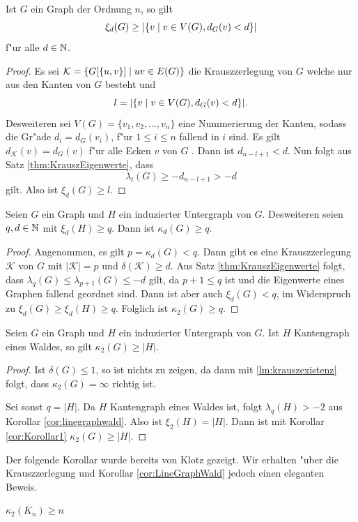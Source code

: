 \begin{corollary}
  Ist $G$ ein Graph der Ordnung $n$, so gilt $$\xi_{d}(G) \geq | \{v \;|\; v\in V(G), d_{G}(v) < d \}|$$
  f"ur alle $d\in {\mathbb{N}}$. 
  \label{cor:xiorderschranke}
\end{corollary}
\begin{proof}
  Es sei $\mathcal{K}= \{G[\{u,v\}] \;|\; uv\in E(G) \}$ die Krauszzerlegung von $G$ welche nur aus den Kanten von $G$ besteht und $$l = |\{v \;|\; v\in V(G), d_{G}(v) < d \}|.$$ 
  Desweiteren sei $V(G) = \{ v_1,v_2,\dots , v_n\}$ eine Nummerierung der Kanten, sodass die Gr"ade $d_i = d_{G}(v_i)$, f"ur $1\leq i \leq n$ fallend in $i$ sind. 
  Es gilt $d_{\mathcal{K}}(v) = d_{G}(v)$ f"ur alle Ecken $v$ von $G$ . Dann ist $d_{n-l+1} < d$. Nun folgt aus Satz \ref{thm:KrauszEigenwerte}, dass
    $$\lambda_{l}(G) \geq - d_{n-l+1} > -d$$
    gilt. Also ist $\xi_{d}(G) \geq l$. 
  \end{proof}

  \begin{corollary}
    \label{cor:Korollar1}
    Seien $G$ ein Graph und $H$ ein induzierter Untergraph von $G$. Desweiteren seien $q,d \in {\mathbb{N}}$ mit $\xi_{d}(H) \geq q$. Dann ist $\kappa_{d}(G) \geq q$.
  \end{corollary}

  \begin{proof}
    Angenommen, es gilt $p = \kappa_{d}(G) < q$. Dann gibt es  eine Krauszzerlegung $\mathcal{K}$ von $G$ mit $|\mathcal{K}| = p$ und $\delta(\mathcal{K}) \geq d$. 
    Aus Satz \ref{thm:KrauszEigenwerte} folgt, dass $\lambda_{q}(G) \leq \lambda_{p+1}(G) \leq -d $ gilt, da $p+1 \leq q$ ist und die Eigenwerte eines Graphen fallend geordnet sind. 
    Dann ist aber auch $\xi_{d}(G) < q$, im Widerspruch zu $\xi_{d}(G) \geq \xi_{d}(H) \geq  q$. Folglich ist $\kappa_2(G) \geq q$.
  \end{proof}

  \begin{corollary}
    \label{cor:LineGraphWald}
    Seien $G$ ein Graph und $H$ ein induzierter Untergraph von $G$. Ist $H$ Kantengraph eines Waldes, so gilt 
    $\kappa_{2}(G)\geq \left|H\right|$.
  \end{corollary}

  \begin{proof}
    Ist $\delta(G) \leq 1$, so ist nichts zu zeigen, da dann mit \ref{lm:krauszexistenz} folgt, dass $\kappa_2(G) = \infty$ richtig ist.

    Sei sonst $q = |H|$. Da $H$ Kantengraph eines Waldes ist, folgt $\lambda_{q}(H) > -2$ aus Korollar \ref{cor:linegraphwald}. Also ist $\xi_{2}(H) = |H|$.
    Dann ist mit Korollar \ref{cor:Korollar1} $\kappa_{2}\left( G \right) \geq \left| H\right|$.
  \end{proof}
  Der folgende Korollar wurde bereits von Klotz \cite{Klotz89} gezeigt. Wir erhalten "uber die Krauszzerlegung und Korollar \ref{cor:LineGraphWald} jedoch einen eleganten Beweis.
  \begin{corollary}[Klotz]
    $\kappa_{2}\left( K_n \right) \geq n$
  \end{corollary}

